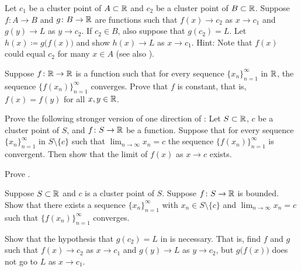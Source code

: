 \begin{exercise} \label{exercise:contlimitcomposition}
Let $c_1$ be a cluster point of $A \subset {\mathbb{R}}$ and $c_2$ be
a cluster point of $B \subset {\mathbb{R}}$.  Suppose 
$f \colon A \to B$ and $g \colon B \to {\mathbb{R}}$ are functions
such that
$f(x) \to c_2$ as $x \to c_1$ and
$g(y) \to L$ as $y \to c_2$.  If $c_2 \in B$, also suppose that $g(c_2) = L$.
Let $h(x) \coloneqq g\bigl(f(x)\bigr)$ and show
$h(x) \to L$ as $x \to c_1$.
Hint: Note that $f(x)$ could equal $c_2$ for many $x \in A$
(see also
).
\end{exercise}

\begin{exercise}
Suppose $f \colon {\mathbb{R}} \to {\mathbb{R}}$ is a function such that for every 
sequence $\{x_n\}_{n=1}^\infty$ in ${\mathbb{R}}$, the sequence
$\bigl\{ f(x_n) \bigr\}_{n=1}^\infty$ converges.  Prove that
$f$ is constant, that is,
$f(x) = f(y)$ for all $x,y \in {\mathbb{R}}$.
\end{exercise}

\begin{exercise} \label{exercise:seqflimitalt}
Prove the following stronger version of one direction of
:
Let $S \subset {\mathbb{R}}$, $c$ be a cluster point of $S$, and $f \colon S \to
{\mathbb{R}}$ be a function.
Suppose that for every sequence $\{x_n\}_{n=1}^\infty$ in $S \setminus \{c\}$ such that
$\lim_{n\to\infty} x_n = c$ the sequence $\bigl\{ f(x_n) \bigr\}_{n=1}^\infty$ is convergent.
Then show that the limit of $f(x)$ as $x \to c$ exists.
\end{exercise}

\begin{exercise}
Prove .
\end{exercise}

\begin{exercise}
Suppose $S \subset {\mathbb{R}}$ and $c$ is a cluster point of $S$.  Suppose $f \colon
S \to {\mathbb{R}}$ is bounded.  Show that there exists a sequence
$\{ x_n \}_{n=1}^\infty$
with $x_n \in S \setminus \{ c \}$ and $\lim_{n\to\infty} x_n = c$ such that
$\bigl\{ f(x_n) \bigr\}_{n=1}^\infty$ converges.
\end{exercise}

\begin{exercise}[Challenging] \label{exercise:contlimitbadcomposition}
Show that the hypothesis that $g(c_2) = L$ in
 is necessary.  That is, find $f$
and $g$ such that $f(x) \to c_2$ as $x \to c_1$ and
$g(y) \to L$ as $y \to c_2$, but $g\bigl(f(x)\bigr)$ does not go to $L$
as $x \to c_1$.
\end{exercise}


